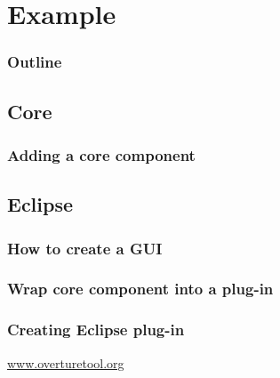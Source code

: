 \section{Example}
%
%
\begin{frame}
  \frametitle{Outline}
  \tableofcontents[current]
\end{frame}


\subsection{Core}
\frame
{
  \frametitle{Adding a core component}


\begin{center}
 
\end{center}
}

\subsection{Eclipse}


\frame
{
  \frametitle{How to create a GUI}


\begin{center}
 
\end{center}
}

\frame
{
  \frametitle{Wrap core component into a plug-in}


\begin{center}
 
\end{center}
}

\frame
{
  \frametitle{Creating Eclipse plug-in}


\begin{center}
 
\end{center}
}



\begin{frame}[plain,c]
  \begin{center}
	\LARGE {}

	\vspace{2cm}
	\href{www.overturetool.org}{www.overturetool.org}
\end{center}
\end{frame}
